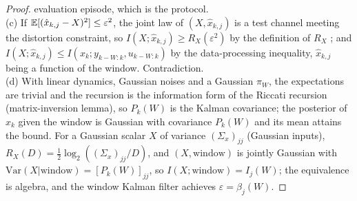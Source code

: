 \begin{proof}
evaluation episode, which is the protocol.\\
(c) If $\mathbb E[(\hat x_{k,j}-X)^2]\le\varepsilon^2$, the joint law of $(X,\hat x_{k,j})$ is a test channel meeting the distortion
constraint, so $I(X;\hat x_{k,j})\ge R_X(\varepsilon^2)$ by the definition of $R_X$ \citep[Ch.~10]{cover2006elements}; and
$I(X;\hat x_{k,j})\le I(x_k;y_{k-W:k},u_{k-W:k})$ by the data-processing inequality, $\hat x_{k,j}$ being a function of the
window. Contradiction.\\
(d) With linear dynamics, Gaussian noises and a Gaussian $\pi_W$, the expectations are trivial and the recursion is
the information form of the Riccati recursion (matrix-inversion lemma), so $P_k(W)$ is the Kalman covariance; the
posterior of $x_k$ given the window is Gaussian with covariance $P_k(W)$ and its mean attains the bound. For a
Gaussian scalar $X$ of variance $(\Sigma_x)_{jj}$ (Gaussian inputs), $R_X(D)=\tfrac12\log_2((\Sigma_x)_{jj}/D)$, and $(X,\text{window})$ is jointly
Gaussian with $\mathrm{Var}(X|\text{window})=[P_k(W)]_{jj}$, so $I(X;\text{window})=I_j(W)$; the equivalence is algebra, and
the window Kalman filter achieves $\varepsilon=\beta_j(W)$.
\end{proof}

